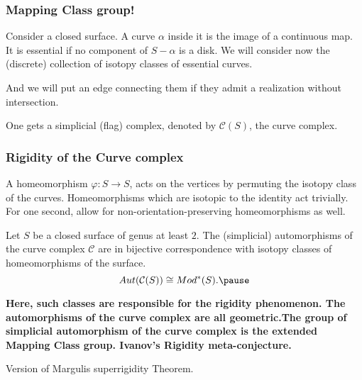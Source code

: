 \documentclass[handout]{beamer}
\theoremstyle{plain}
\begin{document}
\begin{frame}\frametitle{Mapping Class group! }

Consider a  closed  surface. A  curve  $\alpha$ inside  it  is  the  image of  a  continuous  map. It  is  essential if no component of $S-\alpha$ is  a  disk.      
We  will  consider   now  the (discrete) collection of isotopy classes   of  essential  curves.



And  we  will  put  an edge  connecting  them  if   they  admit  a realization  without  intersection. 


One  gets  a simplicial  (flag) complex,  denoted  by $\mathcal{C}(S)$, the  curve  complex. \pause  
\end{frame}
\begin{frame} \frametitle{Rigidity  of  the  Curve  complex}



A homeomorphism $\varphi: S\to  S$,  acts  on the  vertices by  permuting  the isotopy  class  of  the curves. Homeomorphisms which  are  isotopic  to the  identity  act  trivially. 
For  one  second, allow  for   non-orientation-preserving  homeomorphisms as  well. 

\begin{theorem}[Luo]

Let  $S$  be  a  closed  surface  of  genus  at  least  $2$. The (simplicial) automorphisms  of the curve complex $\mathcal{C}$ are  in bijective correspondence  with  isotopy classes of homeomorphisms  of  the  surface.   \pause 
$$Aut(\mathcal{C}(S))\cong Mod^{*}(S).\pause $$
\end{theorem}

\end{frame}

\begin{frame}
\textbf{Here, such classes  are  responsible  for  the  rigidity  phenomenon. The  automorphisms  of  the  curve  complex  are  all geometric.\pause  The  group  of simplicial   automorphism  of  the  curve  complex  is  the  extended  Mapping  Class group. \pause Ivanov's Rigidity  meta-conjecture.}

Version  of  Margulis superrigidity Theorem. 
 

\end{frame}
\end{document}
